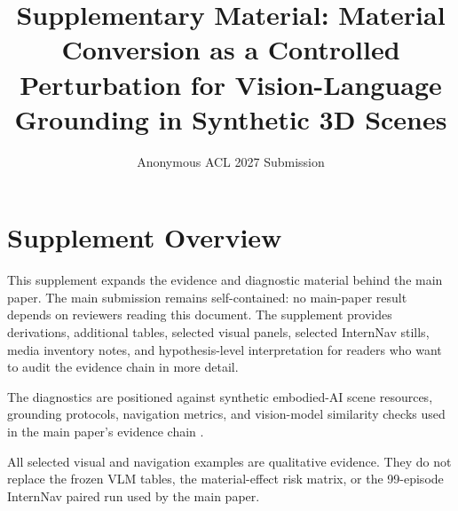 \documentclass[11pt]{article}
\title{Supplementary Material: Material Conversion as a Controlled Perturbation for Vision-Language Grounding in Synthetic 3D Scenes}
\author{Anonymous ACL 2027 Submission}
\begin{document}
\maketitle

\section*{Supplement Overview}
This supplement expands the evidence and diagnostic material behind the main
paper. The main submission remains self-contained: no main-paper result depends
on reviewers reading this document. The supplement provides derivations,
additional tables, selected visual panels, selected InternNav stills, media
inventory notes, and hypothesis-level interpretation for readers who want to
audit the evidence chain in more detail.

The diagnostics are positioned against synthetic embodied-AI scene resources,
grounding protocols, navigation metrics, and vision-model similarity checks
used in the main paper's evidence chain
\citep{Wang2024GRUtopia,Wei2026Ground,Anderson2018Vision,Wang2004Image,Radford2021Learning,Oquab2023DINOv2}.

All selected visual and navigation examples are qualitative evidence. They do
not replace the frozen VLM tables, the material-effect risk matrix, or the
99-episode InternNav paired run used by the main paper.

\appendix
\renewcommand{\thefigure}{S\arabic{figure}}
\renewcommand{\thetable}{S\arabic{table}}
\renewcommand{\theequation}{S\arabic{equation}}
\setcounter{figure}{0}
\setcounter{table}{0}
\setcounter{equation}{0}












\end{document}
